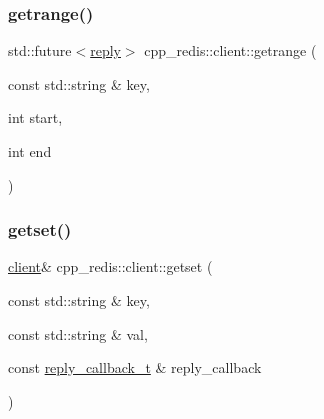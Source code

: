 \mbox{\label{classcpp__redis_1_1client_a3a0ed59f7fc32ba22c1a9be3c02e5468}} 
\subsubsection{\texorpdfstring{getrange()}{getrange()}\hspace{0.1cm}{\footnotesize\ttfamily [2/2]}}
{\footnotesize\ttfamily std\+::future$<$\hyperlink{classcpp__redis_1_1reply}{reply}$>$ cpp\+\_\+redis\+::client\+::getrange (\begin{DoxyParamCaption}\item[{const std\+::string \&}]{key,  }\item[{int}]{start,  }\item[{int}]{end }\end{DoxyParamCaption})}

\mbox{\label{classcpp__redis_1_1client_a124dca021c3aedd3f8cbb52263e7fec8}} 
\subsubsection{\texorpdfstring{getset()}{getset()}\hspace{0.1cm}{\footnotesize\ttfamily [1/2]}}
{\footnotesize\ttfamily \hyperlink{classcpp__redis_1_1client}{client}\& cpp\+\_\+redis\+::client\+::getset (\begin{DoxyParamCaption}\item[{const std\+::string \&}]{key,  }\item[{const std\+::string \&}]{val,  }\item[{const \hyperlink{classcpp__redis_1_1client_a061a1140d36d2eaeda82b09a0bb3f9f2}{reply\+\_\+callback\+\_\+t} \&}]{reply\+\_\+callback }\end{DoxyParamCaption})}

\mbox{\label{classcpp__redis_1_1client_abcbf060105acb8b1d7b14a5102be19a0}} 
